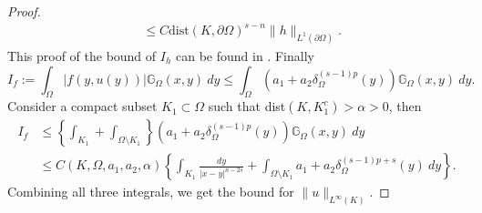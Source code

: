 \documentclass{amsart}
\newcommand{\gk}[1]{\mathbb{G}_{#1}}
\begin{document}
\begin{proof}
\begin{equation*}
\begin{split}
        &\leq C \text{dist}(K,\partial\Omega)^{s-n}\|h\|_{L^{1}(\partial\Omega)}.
        \end{split}
    \end{equation*}
    This proof of the bound of $I_{h}$ can be found in \cite[Theorem 4.6]{AbatangeloVazquez2023}.
    Finally
    \begin{equation*}
        I_{f}:=\int_{\Omega}|f\left(y,u(y)\right)|\gk{\Omega}(x,y)\ dy\leq \int_{\Omega}\left(a_{1}+a_{2}\delta_{\Omega}^{(s-1)p}(y)\right)\gk{\Omega}(x,y)\ dy.
    \end{equation*}
    Consider a compact subset $K_{1}\subset\Omega$ such that dist$(K,K_{1}^{c})>\alpha>0$, then 
    \begin{equation*}
        \begin{split}
            I_{f}&\leq \left\{\int_{K_{1}}+\int_{\Omega\setminus K_{1}}\right\}\left(a_{1}+a_{2}\delta_{\Omega}^{(s-1)p}(y)\right)\gk{\Omega}(x,y)\ dy\\
            &\leq C(K,\Omega,a_{1},a_{2},\alpha)\left\{\int_{K_{1}}\frac{dy}{|x-y|^{n-2s}}+\int_{\Omega\setminus K_{1}}a_{1}+a_{2}\delta_{\Omega}^{(s-1)p+s}(y) \ dy\right\}.
        \end{split} 
    \end{equation*}
    Combining all three integrals, we get the bound for $\|u\|_{L^{\infty}(K)}$.
\end{proof}
\end{document}
